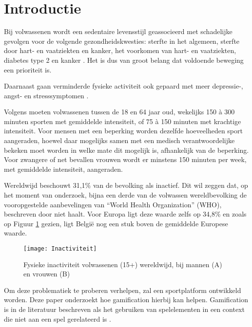 
\section{Introductie}%
\label{sec:introductie}

Bij volwassenen wordt een sedentaire levensstijl geassocieerd met schadelijke gevolgen voor de volgende gezondheidskwesties: sterfte in het algemeen, sterfte door hart- en vaatziekten en kanker, het voorkomen van hart- en vaatziekten, diabetes type 2 en kanker \autocite{Bull2020}. Het is dus van groot belang dat voldoende beweging een prioriteit is.

Daarnaast gaan verminderde fysieke activiteit ook gepaard met meer depressie-, angst- en \linebreak stresssymptomen \autocite{Stanton2020}.

Volgens \textcite{Bull2020} moeten volwassenen tussen de 18 en 64 jaar oud, wekelijks 150 à 300 minuten sporten met gemiddelde intensiteit, of 75 à 150 minuten met krachtige intensiteit. Voor mensen met een beperking worden dezelfde hoeveelheden sport aangeraden, hoewel daar mogelijks samen met een medisch verantwoordelijke bekeken moet worden in welke mate dit mogelijk is, afhankelijk van de beperking. Voor zwangere of net bevallen vrouwen wordt er minstens 150 minuten per week, met gemiddelde intensiteit, aangeraden.

Wereldwijd beschouwt \autocite{Hallal2012} 31,1\% van de bevolking als inactief. Dit wil zeggen dat, op het moment van onderzoek, bijna een derde van de volwassen wereldbevolking de vooropgestelde aanbevelingen van ``World Health Organization'' (WHO), beschreven door \autocite{Bull2020} niet haalt. Voor Europa ligt deze waarde zelfs op 34,8\% en zoals op Figuur \ref{fig:inactivity} gezien, ligt België nog een stuk boven de gemiddelde Europese waarde.

\begin{figure}[t]
    \caption{Fysieke inactiviteit volwassenen (15+) wereldwijd, bij mannen (A) en vrouwen (B) \autocite{Bull2020}}
    \texttt{[image: Inactiviteit]}
    \label{fig:inactivity}
\end{figure}

Om deze problematiek te proberen verhelpen, zal een sportplatform ontwikkeld worden. Deze paper onderzoekt hoe gamification hierbij kan helpen. Gamification is in de literatuur beschreven als het gebruiken van spelelementen in een context die niet aan een spel gerelateerd is \autocite{Gaalen2020}.

